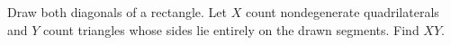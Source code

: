 Draw both diagonals of a rectangle. Let $X$ count nondegenerate quadrilaterals and $Y$ count triangles whose sides lie entirely on the drawn segments. Find $XY$.
